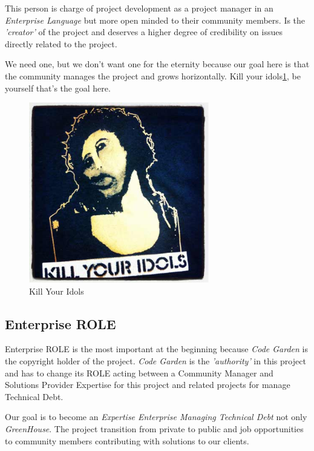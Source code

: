 \documentclass[11pt]{scrartcl}
\begin{document}
\par This person is charge of project development as a project manager in an \emph{Enterprise Language} but more open minded to their community members. Is the \emph{'creator'} of the project and deserves a higher degree of credibility on issues directly related to the project.

\par We need one, but we don't want one for the eternity because our goal here is that the community manages the project and grows horizontally. Kill your idols\ref{kill-your-idols}, be yourself that's the goal here.

\begin{figure}[H]
\centering
\includegraphics[width=0.7\textwidth]{killyouridols.jpg}
\caption{Kill Your Idols}
\label{kill-your-idols}
\end{figure}


\subsection{Enterprise ROLE}
\label{sub:enterprise-role}

\par Enterprise ROLE is the most important at the beginning because \emph{Code Garden} is the copyright holder of the project. \emph{Code Garden} is the \emph{'authority'} in this project and has to change its ROLE acting between a Community Manager and Solutions Provider Expertise for this project and related projects for manage Technical Debt.

\par Our goal is to become an \emph{Expertise Enterprise Managing Technical Debt} not only \emph{GreenHouse}. The project transition from private to public and job opportunities to community members contributing with solutions to our clients.
\end{document}
